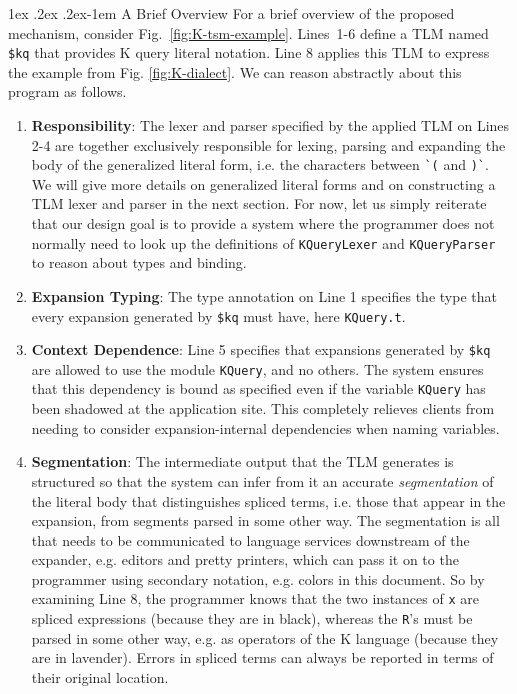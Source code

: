 \documentclass[acmsmall,screen]{acmart}
\makeatletter
\renewcommand{\paragraph}{%
  \@startsection{paragraph}{4}%
  {\z@}{1ex \@plus .2ex \@minus .2ex}{-1em}%
  {\normalfont\normalsize\bfseries}%
}
\newcommand{\li}[1]{\lstinline[basicstyle=\ttfamily\fontsize{9pt}{1em}\selectfont]{#1}}
\makeatother
\begin{document}
\paragraph{A Brief Overview} For a brief overview of the proposed mechanism, consider Fig.~\ref{fig:K-tsm-example}. Lines~1-6 define a TLM named \li{$kq} that provides K query literal notation. Line 8 applies this TLM to express the example from Fig. \ref{fig:K-dialect}. We can reason abstractly about this program as follows.
\begin{enumerate}[leftmargin=12pt]
\item \textbf{Responsibility}: The lexer and parser specified by the applied TLM on Lines 2-4 are together exclusively responsible for lexing, parsing and expanding the body of the generalized literal form, i.e. the characters between \li{`(} and \li{)`}. We will give more details on generalized literal forms and on constructing a TLM lexer and parser in the next section. For now, let us simply reiterate that our design goal is to provide a system where the programmer does not normally need to look up the definitions of \li{KQueryLexer} and \li{KQueryParser} to reason about types and binding. %
\item \textbf{Expansion Typing}: The type annotation on Line 1 specifies the type that every expansion generated by \li{$kq} must have, here \li{KQuery.t}.
\item \textbf{Context Dependence}: Line 5 specifies that expansions generated by \li{$kq} are allowed to use the module \li{KQuery}, and no others. The system ensures that this dependency is  bound as specified even if the variable \li{KQuery} has been shadowed at the application site. This completely relieves clients from needing to consider expansion-internal dependencies when naming variables. %
\item \textbf{Segmentation}: The intermediate output that the TLM generates is structured so that the system can infer from it an accurate \emph{segmentation} of the literal body that distinguishes spliced terms, i.e. those that appear in the expansion, from segments  parsed in some other way. The segmentation is all that needs to be communicated to language services downstream of the expander, e.g. editors and pretty printers, which can pass it on to the programmer using secondary notation, e.g. colors in this document. So by examining Line 8, the programmer knows that the two instances of \li{x} are spliced expressions (because they are in black), whereas the \li{R}'s must be parsed in some other way, e.g. as operators of the K language (because they are in lavender). Errors in spliced terms can always be reported in terms of their original location.

\end{enumerate}
\end{document}
